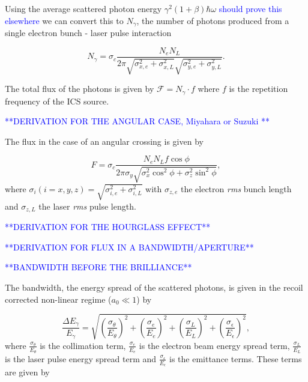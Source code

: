 \documentclass[../main.tex]{subfiles}
\begin{document}
Using the average scattered photon energy $\gamma^{2}\left(1+\beta\right)\hbar\omega$ \textcolor{blue}{should prove this elsewhere} we can convert this to $N_{\gamma}$, the number of photons produced from a single electron bunch - laser pulse interaction

\begin{equation}
N_{\gamma} = \sigma_{c}\frac{N_{e}N_{L}}{2\pi\sqrt{\sigma_{x,e}^{2}+\sigma_{x,L}^2}\sqrt{\sigma_{y,e}^{2}+\sigma_{y,L}^{2}}}.
\label{eq:no_photon_headon}
\end{equation}

The total flux of the photons is given by $\mathcal{F} = N_{\gamma}\cdot f$ where $f$ is the repetition frequency of the ICS source.

\textcolor{blue}{**DERIVATION FOR THE ANGULAR CASE, Miyahara \cite{miyahara2008luminosity}or Suzuki \cite{suzuki1976general}**}

The flux in the case of an angular crossing is given by 

\begin{equation}
F = \sigma_{c}\frac{N_{e}N_{L}f\cos\phi}{2\pi\sigma_{y}\sqrt{\sigma_{x}^{2}\cos^{2}\phi + \sigma_{z}^{2}\sin^{2}\phi}},
\label{eq:crossing_angle_flux}
\end{equation}
where $\sigma_{i}(i=x,y,z) = \sqrt{\sigma_{i,e}^{2}+\sigma_{i,L}^{2}}$ with $\sigma_{z,e}$ the electron \textit{rms} bunch length and $\sigma_{z,L}$ the laser \textit{rms} pulse length.

\textcolor{blue}{**DERIVATION FOR THE HOURGLASS EFFECT**}

\textcolor{blue}{**DERIVATION FOR FLUX IN A BANDWIDTH/APERTURE**}

\textcolor{blue}{**BANDWIDTH BEFORE THE BRILLIANCE**}

The bandwidth, the energy spread of the scattered photons, is given in the recoil corrected non-linear regime ($a_{0}\ll 1$) \cite{ranjan2018simulation} by

\begin{equation}
\frac{\Delta E_{\gamma}}{E_{\gamma}} = \sqrt{\left(\frac{\sigma_{\theta}}{E_{\theta}}\right)^{2}+\left(\frac{\sigma_{e}}{E_{e}}\right)^{2}+\left(\frac{\sigma_{L}}{E_{L}}\right)^{2}+\left(\frac{\sigma_{\epsilon}}{E_{\epsilon}}\right)^{2}},
\label{eq:bandwidth}    
\end{equation}
where $\frac{\sigma_{\theta}}{E_{\theta}}$ is the collimation term, $\frac{\sigma_{e}}{E_{e}}$ is the electron beam energy spread term, $\frac{\sigma_{L}}{E_{L}}$ is the laser pulse energy spread term and $\frac{\sigma_{\epsilon}}{E_{\epsilon}}$ is the emittance terms. These terms are given by
\end{document}
